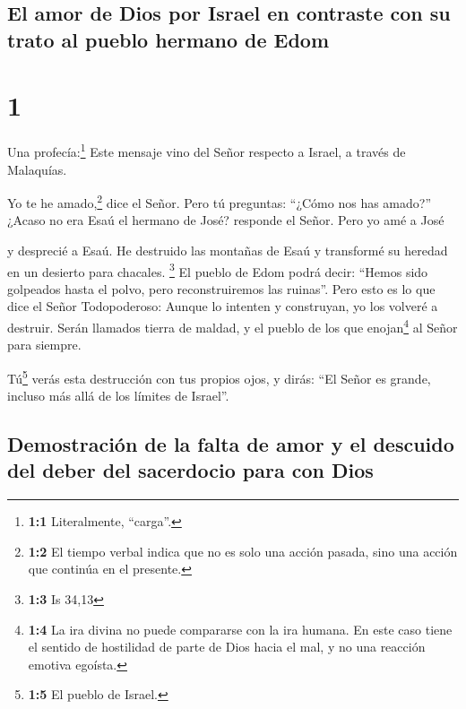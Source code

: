 \hypertarget{el-amor-de-dios-por-israel-en-contraste-con-su-trato-al-pueblo-hermano-de-edom}{%
\subsection{El amor de Dios por Israel en contraste con su trato al
pueblo hermano de
Edom}\label{el-amor-de-dios-por-israel-en-contraste-con-su-trato-al-pueblo-hermano-de-edom}}

\hypertarget{section}{%
\section{1}\label{section}}

 Una profecía:\footnote{\textbf{1:1} Literalmente,
  ``carga''.} Este mensaje vino del Señor respecto a Israel, a través de
Malaquías.

 Yo te he amado,\footnote{\textbf{1:2} El tiempo verbal
  indica que no es solo una acción pasada, sino una acción que continúa
  en el presente.} dice el Señor. Pero tú preguntas: ``¿Cómo nos has
amado?'' ¿Acaso no era Esaú el hermano de José? responde el Señor. Pero
yo amé a José

 y desprecié a Esaú. He destruido las montañas de Esaú y
transformé su heredad en un desierto para chacales. \footnote{\textbf{1:3}
  Is 34,13}  El pueblo de Edom podrá decir: ``Hemos sido
golpeados hasta el polvo, pero reconstruiremos las ruinas''. Pero esto
es lo que dice el Señor Todopoderoso: Aunque lo intenten y construyan,
yo los volveré a destruir. Serán llamados tierra de maldad, y el pueblo
de los que enojan\footnote{\textbf{1:4} La ira divina no puede
  compararse con la ira humana. En este caso tiene el sentido de
  hostilidad de parte de Dios hacia el mal, y no una reacción emotiva
  egoísta.} al Señor para siempre.

 Tú\footnote{\textbf{1:5} El pueblo de Israel.} verás esta
destrucción con tus propios ojos, y dirás: ``El Señor es grande, incluso
más allá de los límites de Israel''.

\hypertarget{demostraciuxf3n-de-la-falta-de-amor-y-el-descuido-del-deber-del-sacerdocio-para-con-dios}{%
\subsection{Demostración de la falta de amor y el descuido del deber del
sacerdocio para con
Dios}\label{demostraciuxf3n-de-la-falta-de-amor-y-el-descuido-del-deber-del-sacerdocio-para-con-dios}}


